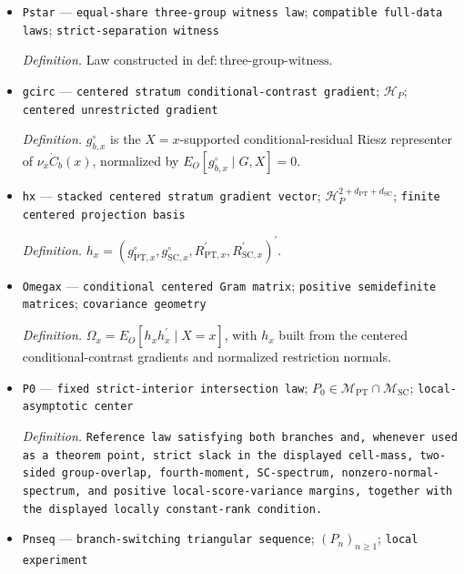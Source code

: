 \documentclass{article}
\begin{document}
\begin{itemize}
  \item \texttt{Pstar} --- \texttt{equal-\allowbreak{}share three-\allowbreak{}group witness law}; \texttt{compatible full-\allowbreak{}data laws}; \texttt{strict-\allowbreak{}separation witness}
  \par\smallskip\noindent\emph{Definition.} Law constructed in \(\mathrm{def{:}three\text{-}group\text{-}witness}\).
  \item \texttt{gcirc} --- \texttt{centered stratum conditional-\allowbreak{}contrast gradient}; \(\mathcal H_P\); \texttt{centered unrestricted gradient}
  \par\smallskip\noindent\emph{Definition.} \(g^{\circ}_{b,x}\) is the \(X=x\)-supported conditional-residual Riesz representer of \(\nu_x\dot C_b(x)\), normalized by \(E_O[g^{\circ}_{b,x}\mid G,X]=0\).
  \item \texttt{hx} --- \texttt{stacked centered stratum gradient vector}; \(\mathcal H_P^{2+d_{\mathrm{PT}}+d_{\mathrm{SC}}}\); \texttt{finite centered projection basis}
  \par\smallskip\noindent\emph{Definition.} \(h_x=(g^{\circ}_{\mathrm{PT},x},g^{\circ}_{\mathrm{SC},x},R_{\mathrm{PT},x}^{\prime},R_{\mathrm{SC},x}^{\prime})^{\prime}\).
  \item \texttt{Omegax} --- \texttt{conditional centered Gram matrix}; \texttt{positive semidefinite matrices}; \texttt{covariance geometry}
  \par\smallskip\noindent\emph{Definition.} \(\Omega_x=E_O[h_xh_x^{\prime}\mid X=x]\), with \(h_x\) built from the centered conditional-contrast gradients and normalized restriction normals.
  \item \texttt{P0} --- \texttt{fixed strict-\allowbreak{}interior intersection law}; \(P_0\in\mathcal M_{\mathrm{PT}}\cap\mathcal M_{\mathrm{SC}}\); \texttt{local-\allowbreak{}asymptotic center}
  \par\smallskip\noindent\emph{Definition.} \texttt{Reference law satisfying both branches and,\allowbreak{} whenever used as a theorem point,\allowbreak{} strict slack in the displayed cell-\allowbreak{}mass,\allowbreak{} two-\allowbreak{}sided group-\allowbreak{}overlap,\allowbreak{} fourth-\allowbreak{}moment,\allowbreak{} SC-\allowbreak{}spectrum,\allowbreak{} nonzero-\allowbreak{}normal-\allowbreak{}spectrum,\allowbreak{} and positive local-\allowbreak{}score-\allowbreak{}variance margins,\allowbreak{} together with the displayed locally constant-\allowbreak{}rank condition.}
  \item \texttt{Pnseq} --- \texttt{branch-\allowbreak{}switching triangular sequence}; \((P_n)_{n\ge1}\); \texttt{local experiment}

\end{itemize}
\end{document}
